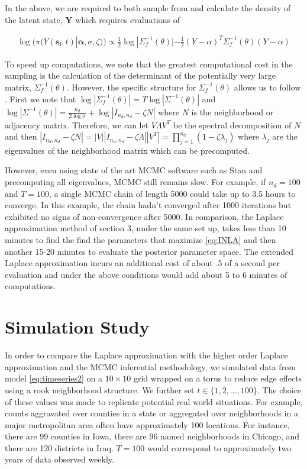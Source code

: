 \documentclass[11pt]{isuthesis}
\begin{document}
	In the above, we are required to both sample from and calculate the density of the latent state, $\boldsymbol{Y}$ which requires evaluations of 
	
	
	\begin{align}
	\log(\pi(Y(\boldsymbol{s_i},t)|\boldsymbol{\alpha},\sigma,\zeta)) \propto  \frac{1}{2} \log | \Sigma_f^{-1}(\theta)| - \frac{1}{2}(Y-\alpha)^T\Sigma_f^{-1}(\theta)(Y-\alpha) \label{eq:log Y}
	\end{align}
	
	To speed up computations, we note that the greatest computational cost in the sampling is the calculation of the determinant of the potentially very large matrix, $\Sigma_f^{-1}(\theta)$.  However, the specific structure for $\Sigma_f^{-1}(\theta)$ allows us to follow \cite{jin2005generalized}.  First we note that $\log | \Sigma_f^{-1}(\theta)|  = T \log | \Sigma^{-1}(\theta)|$ and $\log|\Sigma^{-1}(\theta)|=\frac{n_d}{2\log\sigma}+\log|I_{n_d,n_d}-\zeta N|$ where $N$ is the neighborhood or adjacency matrix.  Therefore, we can let $V \Lambda V^T$ be the spectral decomposition of $N$ and then $|I_{n_d,n_d}-\zeta N|=|V| |I_{n_d,n_d}-\zeta \Lambda| |V^T|=\prod_{j=1}^{n_d}\left(1-\zeta \lambda_j\right)$ where $\lambda_j$ are the eigenvalues of the neighborhood matrix which can be precomputed.  
	
	However, even using state of the art MCMC software such as Stan and precomputing all eigenvalues, MCMC still remains slow.  For example, if $n_d=100$ and $T=100$, a single MCMC chain of length 5000 could take up to 3.5 hours to converge.  In this example, the chain hadn't converged after 1000 iterations but exhibited no signs of non-convergence after 5000.  In comparison, the Laplace approximation method of section 3, under the same set up, takes less than 10 minutes to find the find the parameters that maximize \eqref{eq:INLA} and then another 15-20 minutes to evaluate the posterior parameter space.  The extended Laplace approximation incurs an additional cost of about .5 of a second per evaluation and under the above conditions would add about 5 to 6 minutes of computations.
	
	
	\section{Simulation Study}\label{Sec:Sim2}
	
	In order to compare the Laplace approximation with the higher order Laplace approximation and the MCMC inferential methodology, we simulated data from model \eqref{eq:timeseries2} on a $10 \times 10$ grid wrapped on a torus to reduce edge effects using a rook neighborhood structure.  We further set $t \in \{1,2,...,100\}$.  The choice of these values was made to replicate potential real world situations.  For example, counts aggravated over counties in a state or aggregated over neighborhoods in a major metropolitan area often have approximately 100 locations.  For instance, there are 99 counties in Iowa, there are 96 named neighborhoods in Chicago, and there are 120 districts in Iraq.  $T=100$ would correspond to approximately two years of data observed weekly.
	
\end{document}
